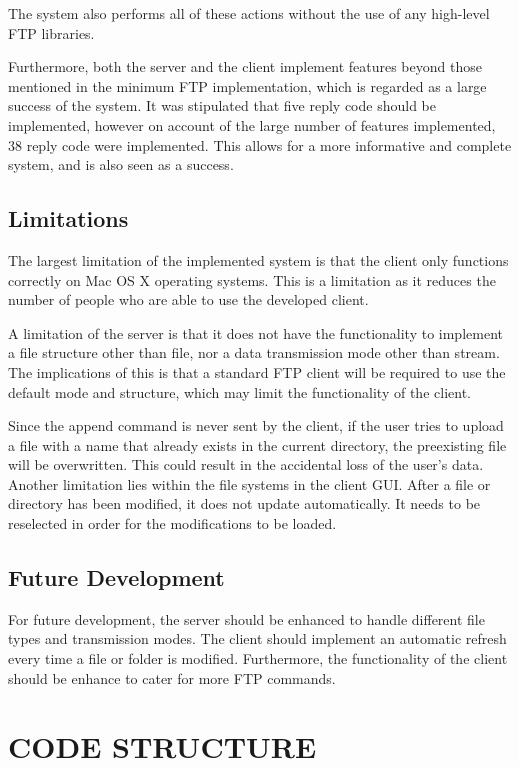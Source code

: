 \documentclass[10pt,twocolumn]{witseiepaper}
\begin{document}
The system also performs all of these actions without the use of any high-level FTP libraries. 

Furthermore, both the server and the client implement features beyond those mentioned in the minimum FTP implementation, which is regarded as a large success of the system. It was stipulated that five reply code should be implemented, however on account of the large number of features implemented, 38 reply code were implemented. This allows for a more informative and complete system, and is also seen as a success.

\subsection{Limitations}
The largest limitation of the implemented system is that the client only functions correctly on Mac OS X operating systems. This is a limitation as it reduces the number of people who are able to use the developed client.

A limitation of the server is that it does not have the functionality to implement a file structure other than file, nor a data transmission mode other than stream. The implications of this is that a standard FTP client will be required to use the default mode and structure, which may limit the functionality of the client.

Since the append command is never sent by the client, if the user tries to upload a file with a name that already exists in the current directory, the preexisting file will be overwritten. This could result in the accidental loss of the user's data. Another limitation lies within the file systems in the client GUI. After a file or directory has been modified, it does not update automatically. It needs to be reselected in order for the modifications to be loaded.

\subsection{Future Development}
For future development, the server should be enhanced to handle different file types and transmission modes. The client should implement an automatic refresh every time a file or folder is modified. Furthermore, the functionality of the client should be enhance to cater for more FTP commands.

\section{CODE STRUCTURE}
\end{document}
